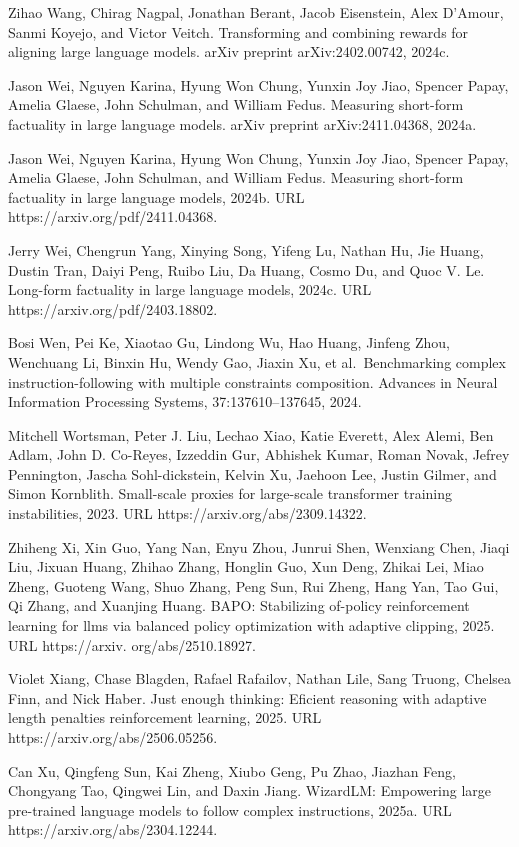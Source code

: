 \documentclass[
  10
]{article}
\begin{document}
Zihao Wang, Chirag Nagpal, Jonathan Berant, Jacob Eisenstein, Alex
D'Amour, Sanmi Koyejo, and Victor Veitch. Transforming and combining
rewards for aligning large language models. arXiv preprint
arXiv:2402.00742, 2024c.

Jason Wei, Nguyen Karina, Hyung Won Chung, Yunxin Joy Jiao, Spencer
Papay, Amelia Glaese, John Schulman, and William Fedus. Measuring
short-form factuality in large language models. arXiv preprint
arXiv:2411.04368, 2024a.

Jason Wei, Nguyen Karina, Hyung Won Chung, Yunxin Joy Jiao, Spencer
Papay, Amelia Glaese, John Schulman, and William Fedus. Measuring
short-form factuality in large language models, 2024b. URL
https://arxiv.org/pdf/2411.04368.

Jerry Wei, Chengrun Yang, Xinying Song, Yifeng Lu, Nathan Hu, Jie Huang,
Dustin Tran, Daiyi Peng, Ruibo Liu, Da Huang, Cosmo Du, and Quoc V. Le.
Long-form factuality in large language models, 2024c. URL
https://arxiv.org/pdf/2403.18802.

Bosi Wen, Pei Ke, Xiaotao Gu, Lindong Wu, Hao Huang, Jinfeng Zhou,
Wenchuang Li, Binxin Hu, Wendy Gao, Jiaxin Xu, et al.~Benchmarking
complex instruction-following with multiple constraints composition.
Advances in Neural Information Processing Systems, 37:137610--137645,
2024.

Mitchell Wortsman, Peter J. Liu, Lechao Xiao, Katie Everett, Alex Alemi,
Ben Adlam, John D. Co-Reyes, Izzeddin Gur, Abhishek Kumar, Roman Novak,
Jefrey Pennington, Jascha Sohl-dickstein, Kelvin Xu, Jaehoon Lee, Justin
Gilmer, and Simon Kornblith. Small-scale proxies for large-scale
transformer training instabilities, 2023. URL
https://arxiv.org/abs/2309.14322.

Zhiheng Xi, Xin Guo, Yang Nan, Enyu Zhou, Junrui Shen, Wenxiang Chen,
Jiaqi Liu, Jixuan Huang, Zhihao Zhang, Honglin Guo, Xun Deng, Zhikai
Lei, Miao Zheng, Guoteng Wang, Shuo Zhang, Peng Sun, Rui Zheng, Hang
Yan, Tao Gui, Qi Zhang, and Xuanjing Huang. BAPO: Stabilizing of-policy
reinforcement learning for llms via balanced policy optimization with
adaptive clipping, 2025. URL https://arxiv. org/abs/2510.18927.

Violet Xiang, Chase Blagden, Rafael Rafailov, Nathan Lile, Sang Truong,
Chelsea Finn, and Nick Haber. Just enough thinking: Eficient reasoning
with adaptive length penalties reinforcement learning, 2025. URL
https://arxiv.org/abs/2506.05256.

Can Xu, Qingfeng Sun, Kai Zheng, Xiubo Geng, Pu Zhao, Jiazhan Feng,
Chongyang Tao, Qingwei Lin, and Daxin Jiang. WizardLM: Empowering large
pre-trained language models to follow complex instructions, 2025a. URL
https://arxiv.org/abs/2304.12244.
\end{document}
